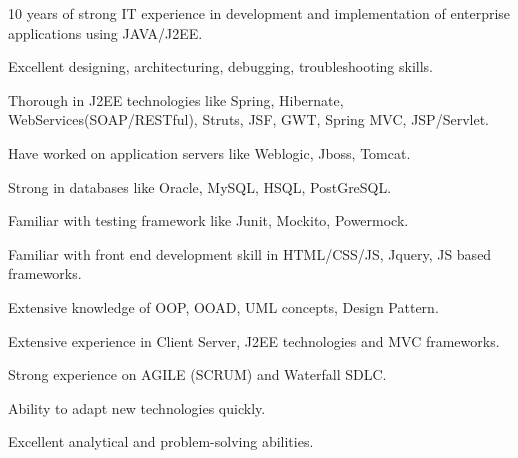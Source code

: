 %
%
%
\begin{description}[align=left]
\item 10 years of strong IT experience in development and implementation of enterprise applications using JAVA/J2EE.
\item Excellent designing, architecturing, debugging, troubleshooting skills.
\item Thorough in J2EE technologies like Spring, Hibernate, WebServices(SOAP/RESTful), Struts, JSF, GWT, Spring MVC, JSP/Servlet.
\item Have worked on application servers like Weblogic, Jboss, Tomcat.
\item Strong in databases like Oracle, MySQL, HSQL, PostGreSQL.
\item Familiar with testing framework like Junit, Mockito, Powermock.
\item Familiar with front end development skill in HTML/CSS/JS, Jquery, JS based frameworks.
\item Extensive knowledge of OOP, OOAD, UML concepts, Design Pattern.
\item Extensive experience in Client Server, J2EE technologies and MVC frameworks.
\item Strong experience on AGILE (SCRUM) and Waterfall SDLC.
\item Ability to adapt new technologies quickly.
\item Excellent analytical and problem-solving abilities.
\end{description}